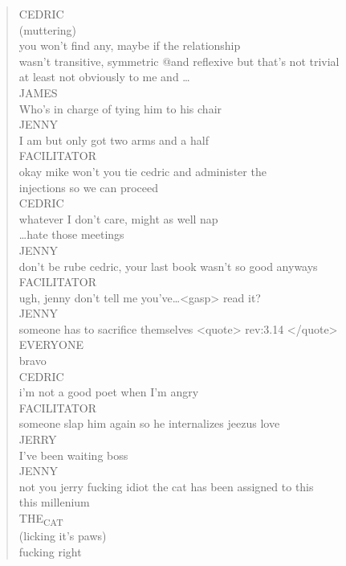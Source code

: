 \documentclass[11pt]{article}
\begin{document}
\begin{verse}
CEDRIC\\
(muttering)\\
you won't find any, maybe if the relationship\\
wasn't transitive, symmetric @and reflexive but that's not trivial\\
at least not obviously to me and \ldots\\
\vspace*{1em}
JAMES\\
Who's in charge of tying him to his chair\\
\vspace*{1em}
JENNY\\
I am but only got two arms and a half\\
\vspace*{1em}
FACILITATOR\\
okay mike won't you tie cedric and administer the\\
injections so we can proceed\\
\vspace*{1em}
CEDRIC\\
whatever I don't care, might as well nap\\
\ldots hate those meetings\\
\vspace*{1em}
JENNY\\
don't be rube cedric, your last book wasn't so good anyways\\
\vspace*{1em}
FACILITATOR\\
ugh, jenny don't tell me you've\ldots <gasp> read it?\\
\vspace*{1em}
JENNY\\
someone has to sacrifice themselves <quote> rev:3.14 </quote>\\
\vspace*{1em}
EVERYONE\\
bravo\\
\vspace*{1em}
CEDRIC\\
i'm not a good poet when I'm angry\\
\vspace*{1em}
FACILITATOR\\
someone slap him again so he internalizes jeezus love\\
\vspace*{1em}
JERRY\\
I've been waiting boss\\
\vspace*{1em}
JENNY\\
not you jerry fucking idiot the cat has been assigned to this\\
this millenium\\
\vspace*{1em}
THE\textsubscript{CAT}\\
(licking it's paws)\\
fucking right\\
\vspace*{1em}
\end{verse}
\end{document}
